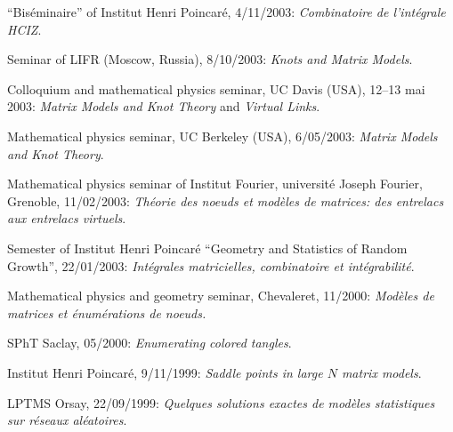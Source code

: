 \s ``Bis\'eminaire'' of Institut Henri Poincar\'e, 4/11/2003: 
{\sl Combinatoire de l'int\'egrale HCIZ}.

\s Seminar of LIFR (Moscow, Russia), 8/10/2003: {\sl Knots and Matrix Models}.

\s Colloquium and mathematical physics seminar, UC Davis (USA), 12--13 mai
2003: {\sl Matrix Models and Knot Theory} and {\sl Virtual Links}.

\s Mathematical physics seminar,
UC Berkeley (USA), 6/05/2003: 
{\sl Matrix Models and Knot Theory}.

\s Mathematical physics seminar of
Institut Fourier, universit\'e Joseph Fourier,
Grenoble, 11/02/2003: 
{\sl Th\'eorie des noeuds et mod\`eles de matrices: des entrelacs aux entrelacs virtuels}.

\s Semester of Institut Henri Poincar\'e 
``Geometry and Statistics of Random Growth'', 
22/01/2003: {\sl Int\'egrales matricielles, combinatoire et int\'egrabilit\'e}.

\s Mathematical physics and geometry seminar,
Chevaleret, 11/2000: 
{\sl Mod\`eles de matrices et \'enum\'erations de noeuds.}

\s SPhT Saclay, 05/2000: {\sl Enumerating colored tangles}.

\s Institut Henri Poincar\'e, 9/11/1999: 
{\sl Saddle points in large $N$ matrix models}.

\s LPTMS Orsay, 22/09/1999:
{\sl Quelques solutions exactes de 
mod\`eles statistiques sur r\'eseaux al\'eatoires}.

\endsec

